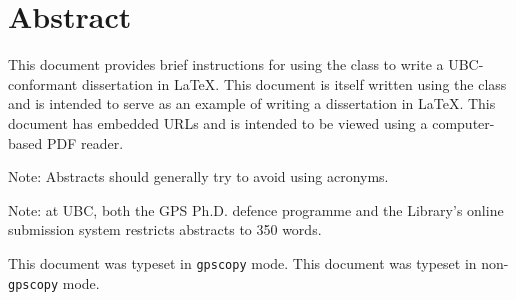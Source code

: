 
\chapter{Abstract}

This document provides brief instructions for using the 
class to write a \acs{UBC}-conformant dissertation in \LaTeX.  This
document is itself written using the  class and is
intended to serve as an example of writing a dissertation in \LaTeX.
This document has embedded \acp{URL} and is intended to be viewed
using a computer-based \ac{PDF} reader.

Note: Abstracts should generally try to avoid using acronyms.

Note: at \ac{UBC}, both the \ac{GPS} Ph.D. defence programme and the
Library's online submission system restricts abstracts to 350
words.

\ifgpscopy
  This document was typeset in \texttt{gpscopy} mode.
\else
  This document was typeset in non-\texttt{gpscopy} mode.
\fi

